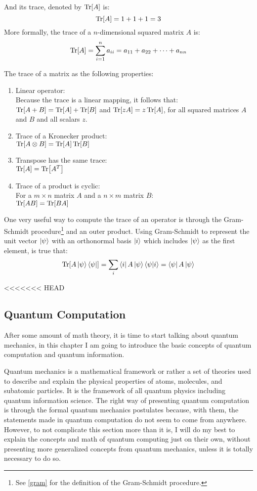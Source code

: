 And its trace, denoted by $\Tr[A]$ is:
$$
\Tr[A] = 1 + 1 + 1 = 3
$$
More formally, the trace of a $n$-dimensional squared matrix $A$ is:
$$
\Tr[A] = \sum_{i=1}^{n} a_{ii} = a_{11} + a_{22} + \cdots + a_{nn}
$$


The trace of a matrix as the following properties:
\begin{enumerate}
	\item Linear operator: \\
	Because the trace is a linear mapping, it follows that:\\
	$\Tr[A+B] = \Tr[A] + \Tr[B]$ and $\Tr[zA] = z \Tr[A]$, for all squared matrices $A$ and $B$ and all scalars $z$.
	\item Trace of a Kronecker product: \\
	$\Tr[A \otimes B] = \Tr[A]\Tr[B]$
	\item Transpose has the same trace: \\
	$\Tr[A]=\Tr[A^T]$
	\item Trace of a product is cyclic: \\
	For a $m \times n$ matrix $A$ and a $n \times m$ matrix $B$:\\
	$\Tr[AB]=\Tr[BA]$
\end{enumerate}

One very useful way to compute the trace of an operator is through the Gram-Schmidt procedure\footnote{See \ref{gram} for the definition of the Gram-Schmidt procedure.} and an outer product. 
Using Gram-Schmidt to represent the unit vector $\ket{\psi}$ with an orthonormal basis $\ket{i}$ which includes $\ket{\psi}$ as the first element, is true that:
$$
\Tr[A\ket{\psi}\bra{\psi}] = \sum_i \bra{i}A\ket{\psi}\bra{\psi}\ket{i} = \bra{\psi}A\ket{\psi}
$$

<<<<<<< HEAD
\subsection{Quantum Computation}
After some amount of math theory, it is time to start talking about quantum mechanics, in this chapter I am going to introduce the basic concepts of quantum computation and quantum information.

Quantum mechanics is a mathematical framework or rather a set of theories used to describe and explain the physical properties of atoms, molecules, and subatomic particles. It is the framework of all quantum physics including quantum information science. The right way of presenting quantum computation is through the formal quantum mechanics postulates because, with them, the statements made in quantum computation do not seem to come from anywhere. However, to not complicate this section more than it is, I will do my best to explain the concepts and math of quantum computing just on their own, without presenting more generalized concepts from quantum mechanics, unless it is totally necessary to do so.

